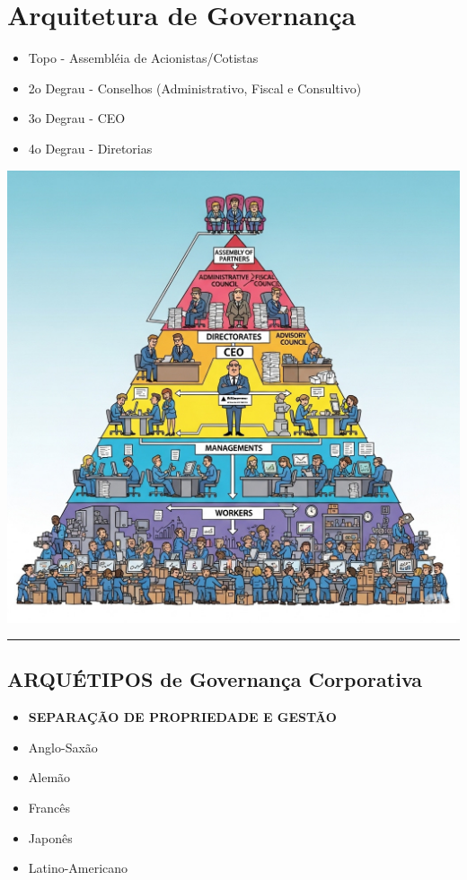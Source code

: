 \documentclass[
]{book}
\begin{document}
\section{Arquitetura de Governança}\label{arquitetura-de-governanuxe7a}

\begin{itemize}
\item
  Topo - Assembléia de Acionistas/Cotistas
\item
  2o Degrau - Conselhos (Administrativo, Fiscal e Consultivo)
\item
  3o Degrau - CEO
\item
  4o Degrau - Diretorias
\end{itemize}

\includegraphics{images/02-2025-08-12_13/00-topo_piramide.jpg}

\begin{center}\rule{0.5\linewidth}{0.5pt}\end{center}

\subsection{ARQUÉTIPOS de Governança Corporativa}\label{arquuxe9tipos-de-governanuxe7a-corporativa}

\begin{itemize}
\item
  \textbf{SEPARAÇÃO DE PROPRIEDADE E GESTÃO}
\item
  Anglo-Saxão
\item
  Alemão
\item
  Francês
\item
  Japonês
\item
  Latino-Americano
\end{itemize}
\end{document}
